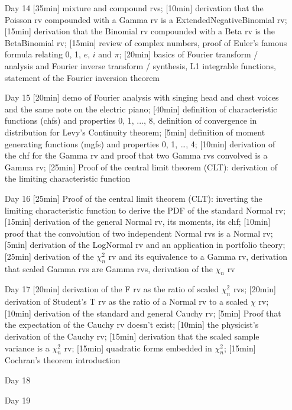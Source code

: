 \begin{enumerate}
\item[Day 14]  [35min] mixture and compound rvs; [10min] derivation that the Poisson rv compounded with a Gamma rv is a ExtendedNegativeBinomial rv; [15min] derivation that the Binomial rv compounded with a Beta rv is the BetaBinomial rv; [15min] review of complex numbers, proof of Euler's famous formula relating 0, 1, $e$, $i$ and $\pi$; [20min] basics of Fourier transform / analysis and Fourier inverse transform / synthesis, L1 integrable functions, statement of the Fourier inversion theorem

\item[Day 15] [20min] demo of Fourier analysis with singing head and chest voices and the same note on the electric piano; [40min] definition of characteristic functions (chfs) and properties 0, 1, ..., 8, definition of convergence in distribution for Levy's Continuity theorem; [5min] definition of moment generating functions (mgfs) and properties 0, 1, \ldots, 4; [10min] derivation of the chf for the Gamma rv and proof that two Gamma rvs convolved is a Gamma rv; [25min] Proof of the central limit theorem (CLT): derivation of the limiting characteristic function
 

\item[Day 16] [25min] Proof of the central limit theorem (CLT): inverting the limiting characteristic function to derive the PDF of the standard Normal rv; [15min] derivation of the general Normal rv, its moments, its chf; [10min] proof that the convolution of two independent Normal rvs is a Normal rv; [5min] derivation of the LogNormal rv and an application in portfolio theory; [25min] derivation of the $\chi^2_n$ rv and its equivalence to a Gamma rv, derivation that scaled Gamma rvs are Gamma rvs, derivation of the $\chi_n$ rv

\item[Day 17] [20min] derivation of the F rv as the ratio of scaled $\chi^2_n$ rvs; [20min] derivation of Student's T rv as the ratio of a Normal rv to a scaled $\chi$ rv; [10min] derivation of the standard and general Cauchy rv; [5min] Proof that the expectation of the Cauchy rv doesn't exist; [10min] the physicist's derivation of the Cauchy rv; [15min] derivation that the scaled sample variance is a $\chi^2_n$ rv; [15min] quadratic forms embedded in $\chi^2_n$; [15min] Cochran's theorem introduction


\item[Day 18] 
\item[Day 19] 



\end{enumerate}
